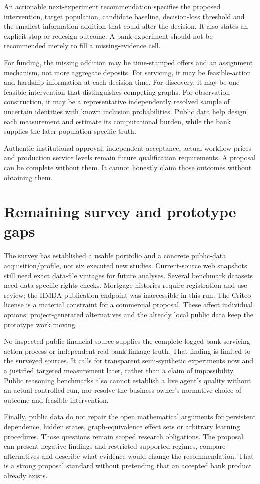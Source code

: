 An actionable next-experiment recommendation specifies the proposed
intervention, target population, candidate baseline, decision-loss
threshold and the smallest information addition that could alter the
decision. It also states an explicit stop or redesign outcome. A bank
experiment should not be recommended merely to fill a missing-evidence
cell.

For funding, the missing addition may be time-stamped offers and an
assignment mechanism, not more aggregate deposits. For servicing, it may
be feasible-action and hardship information at each decision time. For
discovery, it may be one feasible intervention that distinguishes
competing graphs. For observation construction, it may be a
representative independently resolved sample of uncertain identities
with known inclusion probabilities. Public data help design each
measurement and estimate its computational burden, while the bank
supplies the later population-specific truth.

Authentic institutional approval, independent acceptance, actual
workflow prices and production service levels remain future
qualification requirements. A proposal can be complete without them. It
cannot honestly claim those outcomes without obtaining them.

\hypertarget{remaining-survey-and-prototype-gaps}{%
\section{Remaining survey and prototype
gaps}\label{remaining-survey-and-prototype-gaps}}

The survey has established a usable portfolio and a concrete public-data
acquisition/profile, not six executed new studies. Current-source web
snapshots still need exact data-file vintages for future analyses.
Several benchmark datasets need data-specific rights checks. Mortgage
histories require registration and use review; the HMDA publication
endpoint was inaccessible in this run. The Criteo license is a material
constraint for a commercial proposal. These affect individual options;
project-generated alternatives and the already local public data keep
the prototype work moving.

No inspected public financial source supplies the complete logged bank
servicing action process or independent real-bank linkage truth. That
finding is limited to the surveyed sources. It calls for transparent
semi-synthetic experiments now and a justified targeted measurement
later, rather than a claim of impossibility. Public reasoning benchmarks
also cannot establish a live agent's quality without an actual
controlled run, nor resolve the business owner's normative choice of
outcome and feasible intervention.

Finally, public data do not repair the open mathematical arguments for
persistent dependence, hidden states, graph-equivalence effect sets or
arbitrary learning procedures. Those questions remain scoped research
obligations. The proposal can present negative findings and restricted
supported regimes, compare alternatives and describe what evidence would
change the recommendation. That is a strong proposal standard without
pretending that an accepted bank product already exists.

